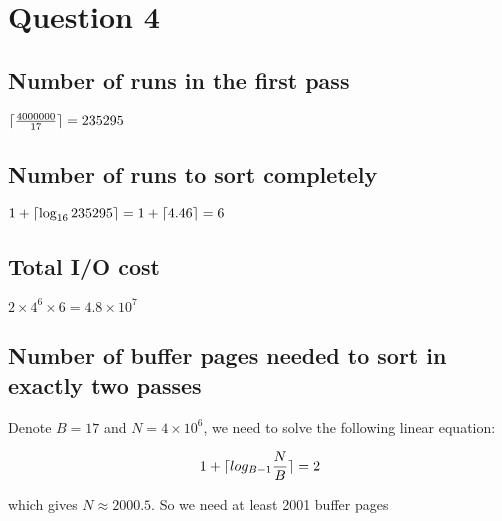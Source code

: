 \section{Question 4}\label{question-4}

\subsection{Number of runs in the first pass}

$\lceil\frac{4000000}{17}\rceil = 235295$

\subsection{Number of runs to sort completely}

$1 + \lceil\log_{16} 235295\rceil = 1 + \lceil4.46\rceil = 6$

\subsection{Total I/O cost}

$2 \times 4^6 \times 6 = 4.8 \times 10^7$

\subsection{Number of buffer pages needed to sort in exactly two passes}

Denote $B=17$ and $N=4\times 10^6$, we need to solve the following linear equation:

\[1 + \lceil log_{B-1} \frac{N}{B}\rceil = 2 \]

which  gives $N \approx 2000.5$. So we need at least 2001 buffer pages